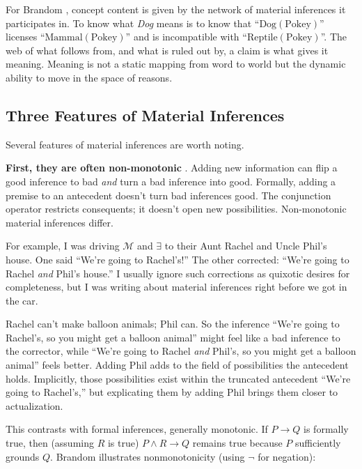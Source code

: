 \documentclass[12pt]{book}
\begin{document}
For Brandom \parencite*{Brandom2000}, concept content is given by the network of material inferences it participates in. To know what \emph{Dog} means is to know that ``\(\text{Dog}(\text{Pokey})\)'' licenses ``\(\text{Mammal}(\text{Pokey})\)'' and is incompatible with ``\(\text{Reptile}(\text{Pokey})\)''. The web of what follows from, and what is ruled out by, a claim is what gives it meaning. Meaning is not a static mapping from word to world but the dynamic ability to move in the space of reasons.

\subsection*{Three Features of Material Inferences}\label{three-features-of-material-inferences}

Several features of material inferences are worth noting.

\textbf{First, they are often non-monotonic} \parencite[88]{Brandom2000}. Adding new information can flip a good inference to bad \emph{and} turn a bad inference into good. Formally, adding a premise to an antecedent doesn't turn bad inferences good. The conjunction operator restricts consequents; it doesn't open new possibilities. Non-monotonic material inferences differ.

For example, I was driving \(\mathcal{M}\) and \(\exists\) to their Aunt Rachel and Uncle Phil's house. One said ``We're going to Rachel's!'' The other corrected: ``We're going to Rachel \emph{and} Phil's house.'' I usually ignore such corrections as quixotic desires for completeness, but I was writing about material inferences right before we got in the car.

Rachel can't make balloon animals; Phil can. So the inference ``We're going to Rachel's, so you might get a balloon animal'' might feel like a bad inference to the corrector, while ``We're going to Rachel \emph{and} Phil's, so you might get a balloon animal'' feels better. Adding Phil adds to the field of possibilities the antecedent holds. Implicitly, those possibilities exist within the truncated antecedent ``We're going to Rachel's,'' but explicating them by adding Phil brings them closer to actualization.

This contrasts with formal inferences, generally monotonic. If \(P \rightarrow Q\) is formally true, then (assuming \(R\) is true) \(P \land R \rightarrow Q\) remains true because \(P\) sufficiently grounds \(Q\). Brandom \parencite[88]{Brandom2000} illustrates nonmonotonicity (using \(\neg\) for negation):
\end{document}
